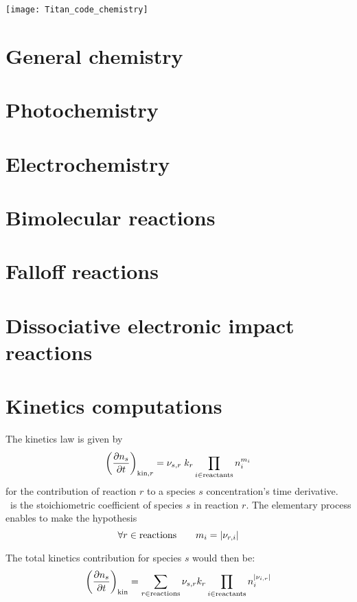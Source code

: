 \noindent\texttt{[image: Titan\_code\_chemistry]}

\section{General chemistry}


\section[Titan_code_photochem]{Photochemistry}


\section{Electrochemistry}


\section{Bimolecular reactions}
\label{Titan_bimol_sec}


\section{Falloff reactions}


\section{Dissociative electronic impact reactions}


\section{Kinetics computations}
The kinetics law is given by
\begin{equation}
\left(\frac{\partial n_s}{\partial t}\right)_{\text{kin},r} = {\nu_{s,r}}\; k_{r} \prod_{i\in\text{reactants}}n_i^{{m_{i}}}
\end{equation}
for the contribution of reaction $r$ to a species $s$ concentration's
time derivative. \ is the stoichiometric coefficient of species
$s$ in reaction $r$. The elementary process enables to make the hypothesis
\begin{equation}
\forall r \in \text{reactions}\qquad
{m_{i}} = |{\nu_{r,i}}|
\end{equation}

The total kinetics contribution for species $s$ would then be:
\begin{equation}
\left(\frac{\partial n_s}{\partial t}\right)_\text{kin} = \sum_{r\in \text{reactions}} {\nu_{s,r}} k_{r} \prod_{i\in\text{reactants}}n_i^{|{\nu_{i,r}}|}
\label{Titan:kinetics}
\end{equation}
